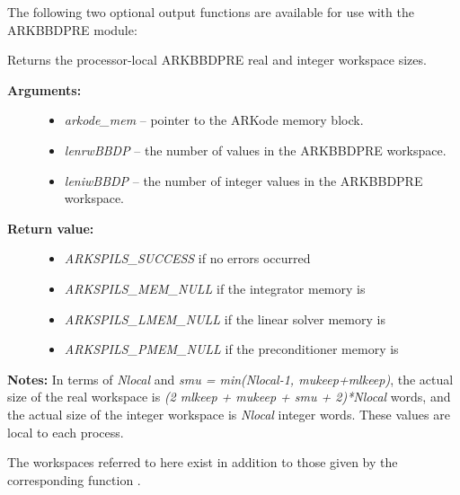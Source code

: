 \documentclass[letterpaper,10pt,english]{sphinxmanual}
\begin{document}
The following two optional output functions are available for use with
the ARKBBDPRE module:

\begin{fulllineitems}
\label{c_interface/Preconditioners:c.ARKBBDPrecGetWorkSpace}
Returns the processor-local ARKBBDPRE real and
integer workspace sizes.
\begin{description}
\item[{\textbf{Arguments:}}] \leavevmode\begin{itemize}
\item {} 
\emph{arkode\_mem} -- pointer to the ARKode memory block.

\item {} 
\emph{lenrwBBDP} -- the number of  values in the
ARKBBDPRE workspace.

\item {} 
\emph{leniwBBDP} -- the number of integer values in the  ARKBBDPRE workspace.

\end{itemize}

\item[{\textbf{Return value:}}] \leavevmode\begin{itemize}
\item {} 
\emph{ARKSPILS\_SUCCESS} if no errors occurred

\item {} 
\emph{ARKSPILS\_MEM\_NULL} if the integrator memory is 

\item {} 
\emph{ARKSPILS\_LMEM\_NULL} if the linear solver memory is 

\item {} 
\emph{ARKSPILS\_PMEM\_NULL} if the preconditioner memory is 

\end{itemize}

\end{description}

\textbf{Notes:}  In terms of \emph{Nlocal} and \emph{smu = min(Nlocal-1,
mukeep+mlkeep)}, the actual size of the real workspace is \emph{(2
mlkeep + mukeep + smu + 2)*Nlocal}   words, and the
actual size of the integer workspace is \emph{Nlocal} integer
words. These values are local to each process.

The workspaces referred to here exist in addition to those given by
the corresponding function {\hyperref[c_interface/User_callable:c.ARKSpilsGetWorkSpace]{\emph{}}}.

\end{fulllineitems}
\end{document}
